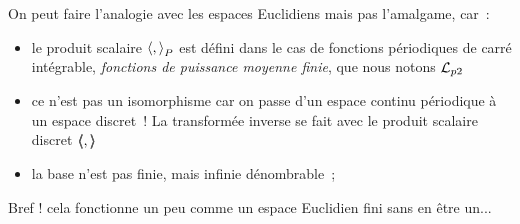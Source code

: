 
 On peut faire l'analogie avec les espaces Euclidiens mais pas l'amalgame, car~:
 \begin{itemize}
   \item le produit scalaire $\langle,{\rangle}_P$ est défini dans le cas de fonctions périodiques de carré intégrable, \emph{fonctions de puissance moyenne finie},  que nous notons $\mathcal{L}_{p 2}$
 \item ce n'est pas un isomorphisme car on passe d'un espace continu périodique à
   un espace discret~! La transformée inverse se fait avec le produit scalaire discret $\langle\!\!\langle,\rangle\!\!\rangle$
\item la base n'est pas finie, mais infinie dénombrable~;
\end{itemize}

Bref ! cela fonctionne un peu comme un espace Euclidien fini sans en être un...


